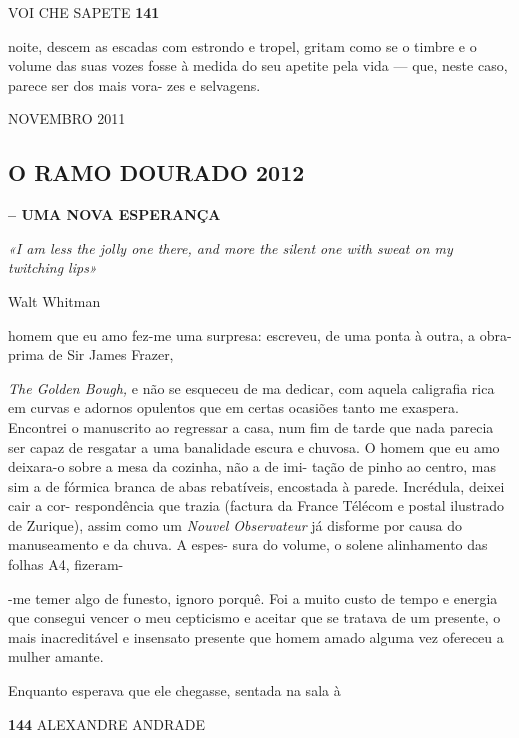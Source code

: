 VOI CHE SAPETE \textbf{141}

noite, descem as escadas com estrondo e tropel, gritam como se o timbre
e o volume das suas vozes fosse à medida do seu apetite pela vida ---
que, neste caso, parece ser dos mais vora- zes e selvagens.

NOVEMBRO 2011

\subsection{O RAMO DOURADO 2012}

\textbf{-- UMA NOVA ESPERANÇA}

\emph{«I am less the jolly one there, and more the silent one with sweat
on my twitching lips»}

Walt Whitman

homem que eu amo fez-me uma surpresa: escreveu, de uma ponta à outra, a
obra-prima de Sir James Frazer,

\emph{The Golden Bough, }e não se esqueceu de ma dedicar, com aquela
caligrafia rica em curvas e adornos opulentos que em certas ocasiões
tanto me exaspera. Encontrei o manuscrito ao regressar a casa, num fim
de tarde que nada parecia ser capaz de resgatar a uma banalidade escura
e chuvosa. O homem que eu amo deixara-o sobre a mesa da cozinha, não a
de imi- tação de pinho ao centro, mas sim a de fórmica branca de abas
rebatíveis, encostada à parede. Incrédula, deixei cair a cor-
respondência que trazia (factura da France Télécom e postal ilustrado de
Zurique), assim como um \emph{Nouvel Observateur }já disforme por causa
do manuseamento e da chuva. A espes- sura do volume, o solene
alinhamento das folhas A4, fizeram-

-me temer algo de funesto, ignoro porquê. Foi a muito custo de tempo e
energia que consegui vencer o meu cepticismo e aceitar que se tratava de
um presente, o mais inacreditável e insensato presente que homem amado
alguma vez ofereceu a mulher amante.

Enquanto esperava que ele chegasse, sentada na sala à

\textbf{144 }ALEXANDRE ANDRADE

